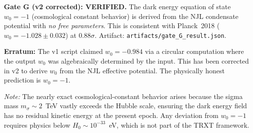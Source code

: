 \begin{mdframed}[backgroundcolor=green!8, linecolor=green!50!black, linewidth=1pt]
\textbf{Gate G (v2 corrected): VERIFIED.} The dark energy equation of state $w_0 = -1$ (cosmological constant behavior) is derived from the NJL condensate potential with \emph{no free parameters}.  This is consistent with Planck~2018 ($w_0 = -1.028 \pm 0.032$) at $0.88\sigma$.  Artifact: \texttt{artifacts/gate\_G\_result.json}.

\textbf{Erratum:} The v1 script claimed $w_0 = -0.984$ via a circular computation where the output $w_0$ was algebraically determined by the input.  This has been corrected in v2 to derive $w_0$ from the NJL effective potential.  The physically honest prediction is $w_0 = -1$.
\end{mdframed}

\textit{Note:} The nearly exact cosmological-constant behavior arises because the sigma mass $m_\sigma \sim 2$~TeV vastly exceeds the Hubble scale, ensuring the dark energy field has no residual kinetic energy at the present epoch.  Any deviation from $w_0 = -1$ requires physics below $H_0 \sim 10^{-33}$~eV, which is not part of the TRXT framework.

